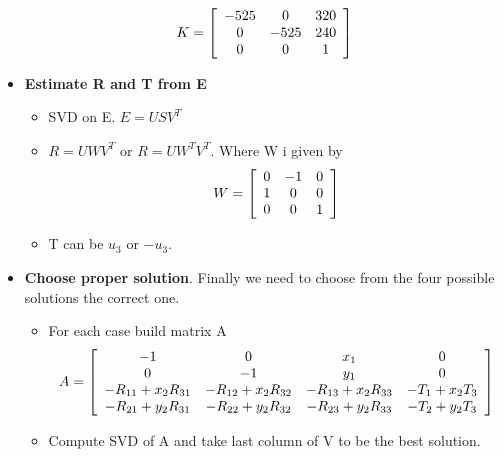 \documentclass[a4paper,12pt]{article}
\begin{document}
\begin{itemize}
            \begin{equation}
                       K = \left[ 
            \begin{array}[]{ccc}
                        -525 & 0 & 320 \\
                        0 & -525 & 240 \\
                        0 & 0 & 1 \\
                    \end{array}
            \right] 
            \end{equation}
        \item \textbf{Estimate R and T from E}
            \begin{itemize}
                \item SVD on E. $E = USV^T$
                \item $R  = UWV^T$ or $R = UW^TV^T$. Where W i given by 
                    \begin{equation}
                        W = \left [ 
                            \begin{array}[]{ccc}
                                0 & -1 & 0  \\
                                1 & 0 & 0   \\
                                0 & 0 & 1
                            \end{array}
                            \right ] 
                    \end{equation}
                \item T can be $u_3$ or $-u_3$.
            \end{itemize}
        \item \textbf{Choose proper solution}. Finally we need to choose from the four
            possible solutions the correct one. 
            \begin{itemize}
                \item For each case build matrix A
                    \begin{equation}
                        A = \left [ 
                            \begin{array}[]{cccc}
                                -1 & 0 & x_1 & 0 \\
                                0 & -1 & y_1 & 0 \\
                                -R_{11} + x_2 R_{31} & -R_{12} + x_2 R_{32} & -R_{13} + x_2 R_{33} & -T_1 + x_2T_3 \\
                                -R_{21} + y_2 R_{31} & -R_{22} + y_2 R_{32} & -R_{23} + y_2 R_{33} & -T_2 + y_2T_3 
                            \end{array}
                            \right ] 
                    \end{equation}
                \item Compute SVD of A and take last column of V to be the best solution.
            \end{itemize}
    \end{itemize}
\end{document}
